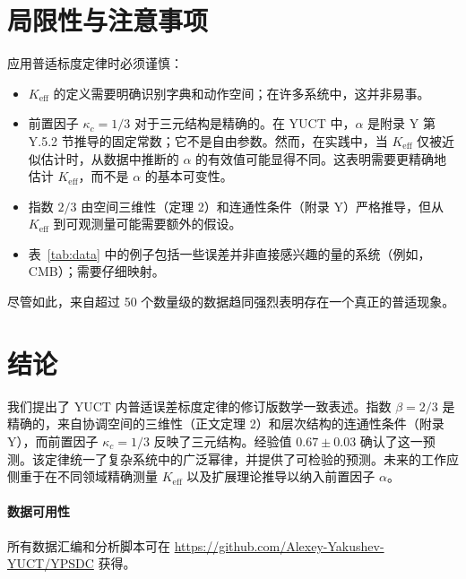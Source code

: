 \documentclass[12pt]{article}
\newcommand{\Keff}{K_{\mathrm{eff}}}
\newcommand{\kappac}{\kappa_c}
\begin{document}
	\section{局限性与注意事项}
	\label{sec:limitations}
	
	应用普适标度定律时必须谨慎：
	\begin{itemize}
		\item \(\Keff\) 的定义需要明确识别字典和动作空间；在许多系统中，这并非易事。
		\item 前置因子 \(\kappac = 1/3\) 对于三元结构是精确的。在 YUCT 中，\(\alpha\) 是附录 Y 第 Y.5.2 节推导的固定常数；它不是自由参数。然而，在实践中，当 \(\Keff\) 仅被近似估计时，从数据中推断的 \(\alpha\) 的有效值可能显得不同。这表明需要更精确地估计 \(\Keff\)，而不是 \(\alpha\) 的基本可变性。
		\item 指数 \(2/3\) 由空间三维性（定理 2）和连通性条件（附录 Y）严格推导，但从 \(\Keff\) 到可观测量可能需要额外的假设。
		\item 表~\ref{tab:data} 中的例子包括一些误差并非直接感兴趣的量的系统（例如，CMB）；需要仔细映射。
	\end{itemize}
	
	尽管如此，来自超过 50 个数量级的数据趋同强烈表明存在一个真正的普适现象。
	
	\section{结论}
	我们提出了 YUCT 内普适误差标度定律的修订版数学一致表述。指数 \(\beta = 2/3\) 是精确的，来自协调空间的三维性（正文定理 2）和层次结构的连通性条件（附录 Y），而前置因子 \(\kappac = 1/3\) 反映了三元结构。经验值 \(0.67 \pm 0.03\) 确认了这一预测。该定律统一了复杂系统中的广泛幂律，并提供了可检验的预测。未来的工作应侧重于在不同领域精确测量 \(\Keff\) 以及扩展理论推导以纳入前置因子 \(\alpha\)。
	
	\paragraph*{数据可用性}
	所有数据汇编和分析脚本可在 \url{https://github.com/Alexey-Yakushev-YUCT/YPSDC} 获得。
	
\end{document}
